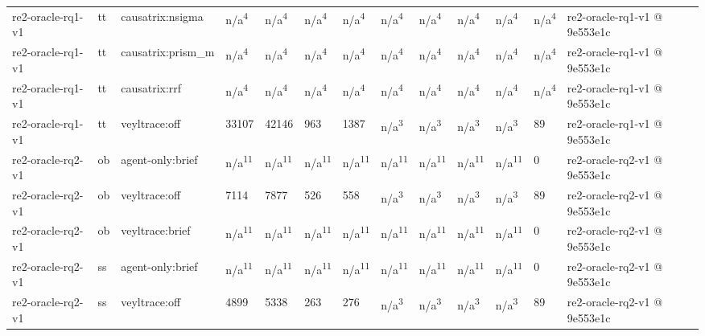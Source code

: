 \begin{table}[t]
\begin{tabular}{lllllllllllll}
re2-oracle-rq1-v1 & tt & causatrix:nsigma & n/a\textsuperscript{4} & n/a\textsuperscript{4} & n/a\textsuperscript{4} & n/a\textsuperscript{4} & n/a\textsuperscript{4} & n/a\textsuperscript{4} & n/a\textsuperscript{4} & n/a\textsuperscript{4} & n/a\textsuperscript{4} & re2-oracle-rq1-v1 @ 9e553e1c \\
re2-oracle-rq1-v1 & tt & causatrix:prism\_m & n/a\textsuperscript{4} & n/a\textsuperscript{4} & n/a\textsuperscript{4} & n/a\textsuperscript{4} & n/a\textsuperscript{4} & n/a\textsuperscript{4} & n/a\textsuperscript{4} & n/a\textsuperscript{4} & n/a\textsuperscript{4} & re2-oracle-rq1-v1 @ 9e553e1c \\
re2-oracle-rq1-v1 & tt & causatrix:rrf & n/a\textsuperscript{4} & n/a\textsuperscript{4} & n/a\textsuperscript{4} & n/a\textsuperscript{4} & n/a\textsuperscript{4} & n/a\textsuperscript{4} & n/a\textsuperscript{4} & n/a\textsuperscript{4} & n/a\textsuperscript{4} & re2-oracle-rq1-v1 @ 9e553e1c \\
re2-oracle-rq1-v1 & tt & veyltrace:off & 33107 & 42146 & 963 & 1387 & n/a\textsuperscript{3} & n/a\textsuperscript{3} & n/a\textsuperscript{3} & n/a\textsuperscript{3} & 89 & re2-oracle-rq1-v1 @ 9e553e1c \\
re2-oracle-rq2-v1 & ob & agent-only:brief & n/a\textsuperscript{11} & n/a\textsuperscript{11} & n/a\textsuperscript{11} & n/a\textsuperscript{11} & n/a\textsuperscript{11} & n/a\textsuperscript{11} & n/a\textsuperscript{11} & n/a\textsuperscript{11} & 0 & re2-oracle-rq2-v1 @ 9e553e1c \\
re2-oracle-rq2-v1 & ob & veyltrace:off & 7114 & 7877 & 526 & 558 & n/a\textsuperscript{3} & n/a\textsuperscript{3} & n/a\textsuperscript{3} & n/a\textsuperscript{3} & 89 & re2-oracle-rq2-v1 @ 9e553e1c \\
re2-oracle-rq2-v1 & ob & veyltrace:brief & n/a\textsuperscript{11} & n/a\textsuperscript{11} & n/a\textsuperscript{11} & n/a\textsuperscript{11} & n/a\textsuperscript{11} & n/a\textsuperscript{11} & n/a\textsuperscript{11} & n/a\textsuperscript{11} & 0 & re2-oracle-rq2-v1 @ 9e553e1c \\
re2-oracle-rq2-v1 & ss & agent-only:brief & n/a\textsuperscript{11} & n/a\textsuperscript{11} & n/a\textsuperscript{11} & n/a\textsuperscript{11} & n/a\textsuperscript{11} & n/a\textsuperscript{11} & n/a\textsuperscript{11} & n/a\textsuperscript{11} & 0 & re2-oracle-rq2-v1 @ 9e553e1c \\
re2-oracle-rq2-v1 & ss & veyltrace:off & 4899 & 5338 & 263 & 276 & n/a\textsuperscript{3} & n/a\textsuperscript{3} & n/a\textsuperscript{3} & n/a\textsuperscript{3} & 89 & re2-oracle-rq2-v1 @ 9e553e1c \\

\end{tabular}
\end{table}

